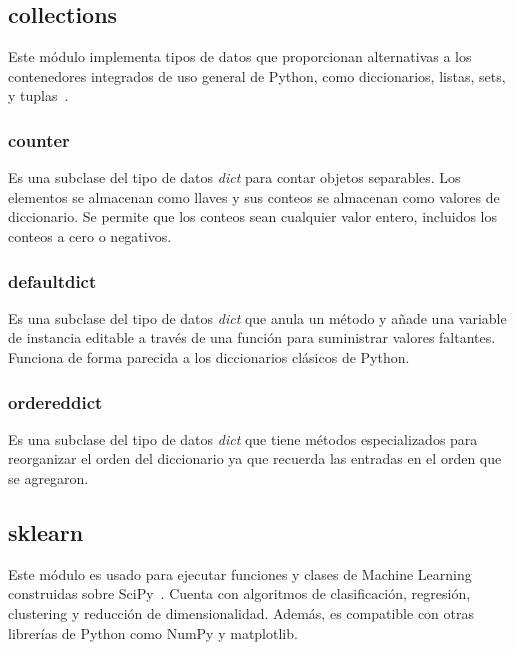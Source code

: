\documentclass[a4paper, 12pt]{book}
\begin{document}
\subsection{collections}
\label{sec:collections}

Este módulo implementa tipos de datos que proporcionan alternativas a los contenedores integrados de uso general de Python, como diccionarios, listas, sets, y tuplas~\cite{collectionWeb}.

\subsubsection{counter}
\label{sec:difflib_counter}

Es una subclase del tipo de datos \textit{dict} para contar objetos separables. Los elementos se almacenan como llaves y sus conteos se almacenan como valores de diccionario. Se permite que los conteos sean cualquier valor entero, incluidos los conteos a cero o negativos.

\subsubsection{defaultdict}
\label{sec:difflib_defaultdict}

Es una subclase del tipo de datos \textit{dict} que anula un método y añade una variable de instancia editable a través de una función para suministrar valores faltantes. Funciona de forma parecida a los diccionarios clásicos de Python.

\subsubsection{ordereddict}
\label{sec:difflib_ordereddict}

Es una subclase del tipo de datos \textit{dict} que tiene métodos especializados para reorganizar el orden del diccionario ya que recuerda las entradas en el orden que se agregaron.

\subsection{sklearn}
\label{sec:sklearn}

Este módulo es usado para ejecutar funciones y clases de Machine Learning construidas sobre SciPy~\cite{sklearnWeb}. Cuenta con algoritmos de clasificación, regresión, clustering y reducción de dimensionalidad. Además, es compatible con otras librerías de Python como NumPy y matplotlib.
\end{document}
